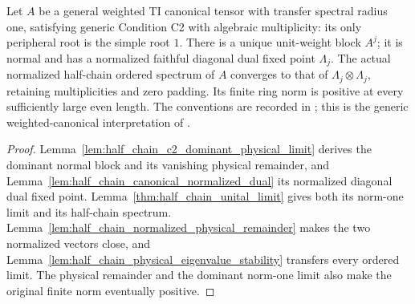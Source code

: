 \begin{theorem}%
    \label{thm:half_chain_general_c2_source}
    \leanok
    Let $A$ be a general weighted TI canonical tensor with transfer
    spectral radius one, satisfying generic Condition C2 with algebraic
    multiplicity: its only peripheral root is the simple root $1$.
    There is a unique unit-weight block $A^j$; it is normal and has a normalized faithful
    diagonal dual fixed point $\Lambda_j$. The actual normalized half-chain
    ordered spectrum of $A$ converges to that of
    $\Lambda_j\otimes\Lambda_j$, retaining multiplicities and zero padding.
    Its finite ring norm is positive at every sufficiently large even
    length. The conventions are recorded in
    \cite{gap:pgvwc07_half_chain_spectrum_conventions}; this is the generic
    weighted-canonical interpretation of \cite[Theorem~6]{PerezGarcia2007Matrix}.
\end{theorem}
\begin{proof}
    \leanok
    Lemma~\ref{lem:half_chain_c2_dominant_physical_limit} derives the
    dominant normal block and its vanishing physical remainder, and
    Lemma~\ref{lem:half_chain_canonical_normalized_dual} its normalized
    diagonal dual fixed point. Lemma~\ref{thm:half_chain_unital_limit}
    gives both its norm-one limit and its half-chain spectrum.
    Lemma~\ref{lem:half_chain_normalized_physical_remainder} makes the two
    normalized vectors close, and
    Lemma~\ref{lem:half_chain_physical_eigenvalue_stability} transfers every
    ordered limit. The physical remainder and the dominant norm-one
    limit also make the original finite norm eventually positive.
\end{proof}
